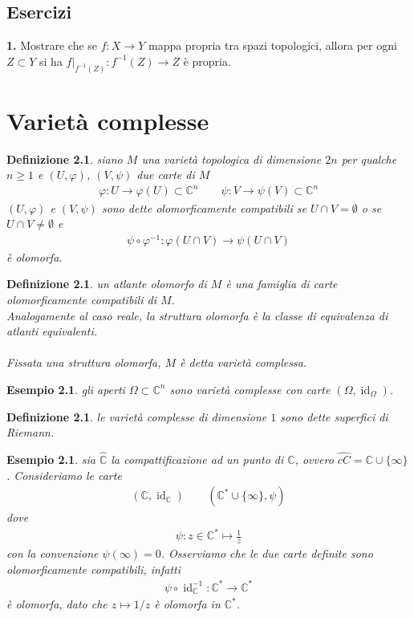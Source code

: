 \documentclass[oneside, 11pt]{amsbook}
\newcommand{\cC}{\mathbb{C}}
\newcommand{\vp}{\varphi}
\newcommand{\co}[1]{\textit{#1}}
\newcommand{\gr}[1]{\textbf{#1}}
\newcommand{\id}{\operatorname{id}}
\newcommand{\0}{{(0)}}
\newcommand{\3}{{(3)}}
\theoremstyle{colonplain}
\theoremstyle{colondefinition}
\newtheorem{defn}[thm]{Definizione}
\newtheorem{ex}[thm]{Esempio}
\theoremstyle{colonremark}
\numberwithin{equation}{chapter}
\begin{document}
\section{Esercizi}
\gr{1.} Mostrare che se $f : X \longrightarrow Y$ mappa propria tra spazi topologici, allora per ogni $Z \subset Y$ si ha $f|_{f^{-1}(Z)} : f^{-1}(Z) \longrightarrow Z$ è propria.

\chapter{Varietà complesse}
\begin{defn}
    siano $M$ una varietà topologica di dimensione $2n$ per qualche $n \geq 1$ e $(U, \vp)$, $(V, \psi)$ due carte di $M$
    \begin{align}
        \vp : U \longrightarrow \vp(U) \subset \cC^n \qquad \psi : V \longrightarrow \psi(V) \subset \cC^n
    \end{align}
    $(U, \vp)$ e $(V, \psi)$ sono dette \co{olomorficamente compatibili} se $U \cap V = \emptyset$ o se $U \cap V \neq \emptyset$ e
    \begin{align}
        \psi \circ \vp^{-1} : \vp(U \cap V) \longrightarrow \psi(U \cap V)
    \end{align}
    è olomorfa.
\end{defn}
\begin{defn}
    un \co{atlante olomorfo} di $M$ è una famiglia di carte olomorficamente compatibili di $M$. \\
    Analogamente al caso reale, la \co{struttura olomorfa} è la classe di equivalenza di atlanti equivalenti. \\ \\
    Fissata una struttura olomorfa, $M$ è detta \co{varietà complessa}.
\end{defn}
\begin{ex}
    gli aperti $\Omega \subset \cC^n$ sono varietà complesse con carte $(\Omega, \id_\Omega)$.
\end{ex}
\begin{defn}
    le varietà complesse di dimensione $1$ sono dette \co{superfici di Riemann}.
\end{defn}
\begin{ex}
    sia $\hat{\cC}$ la compattificazione ad un punto di $\cC$, ovvero $\hat{cC} = \cC \cup \{\infty\}$. Consideriamo le carte
    \begin{align}
        (\cC, \id_\cC) \qquad (\cC^* \cup \{\infty\}, \psi)
    \end{align}
    dove
    \begin{align}
        \psi : z \in \cC^* \mapsto \frac{1}{z}
    \end{align}
    con la convenzione $\psi(\infty) = 0$. Osserviamo che le due carte definite sono olomorficamente compatibili, infatti
    \begin{align}
        \psi \circ \id^{-1}_\cC : \cC^* \longrightarrow \cC^*
    \end{align}
    è olomorfa, dato che $z \mapsto 1/z$ è olomorfa in $\cC^*$.
\end{ex}
\end{document}
